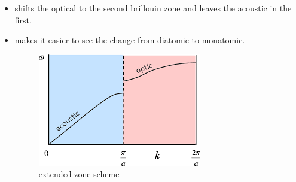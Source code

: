 \begin{itemize}
    \begin{itemize}
        \item shifts the optical to the second brillouin zone and leaves the acoustic in the first.
        \item makes it easier to see the change from diatomic to monatomic.
        \begin{figure}
            \centering
            \includegraphics[width = 0.5\linewidth]{Images/extended_zone_scheme.png}
            \caption{extended zone scheme}
            \label{fig:extended zone scheme}
        \end{figure}
    \end{itemize}
\end{itemize}

